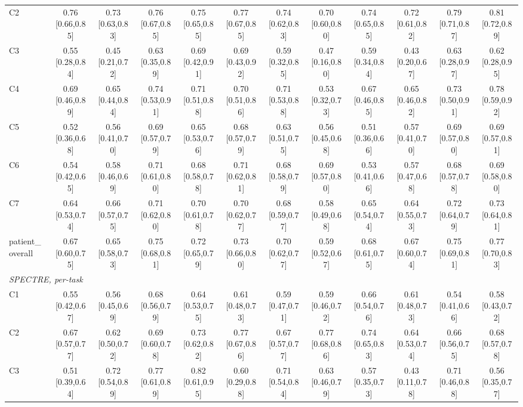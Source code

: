 \begin{tabular}{lccccccccccc}
C2 & 0.76 [0.66,0.85] & 0.73 [0.63,0.83] & 0.76 [0.67,0.85] & 0.75 [0.65,0.85] & 0.77 [0.67,0.85] & 0.74 [0.62,0.83] & 0.70 [0.60,0.80] & 0.74 [0.65,0.85] & 0.72 [0.61,0.82] & 0.79 [0.71,0.87] & 0.81 [0.72,0.89] \\
C3 & 0.55 [0.28,0.84] & 0.45 [0.21,0.72] & 0.63 [0.35,0.89] & 0.69 [0.42,0.91] & 0.69 [0.43,0.92] & 0.59 [0.32,0.85] & 0.47 [0.16,0.80] & 0.59 [0.34,0.84] & 0.43 [0.20,0.67] & 0.63 [0.28,0.97] & 0.62 [0.28,0.95] \\
C4 & 0.69 [0.46,0.89] & 0.65 [0.44,0.84] & 0.74 [0.53,0.91] & 0.71 [0.51,0.88] & 0.70 [0.51,0.86] & 0.71 [0.53,0.88] & 0.53 [0.32,0.73] & 0.67 [0.46,0.85] & 0.65 [0.46,0.82] & 0.73 [0.50,0.91] & 0.78 [0.59,0.92] \\
C5 & 0.52 [0.36,0.68] & 0.56 [0.41,0.70] & 0.69 [0.57,0.79] & 0.65 [0.53,0.76] & 0.68 [0.57,0.79] & 0.63 [0.51,0.75] & 0.56 [0.45,0.68] & 0.51 [0.36,0.66] & 0.57 [0.41,0.70] & 0.69 [0.57,0.80] & 0.69 [0.57,0.81] \\
C6 & 0.54 [0.42,0.65] & 0.58 [0.46,0.69] & 0.71 [0.61,0.80] & 0.68 [0.58,0.78] & 0.71 [0.62,0.81] & 0.68 [0.58,0.79] & 0.69 [0.57,0.80] & 0.53 [0.41,0.66] & 0.57 [0.47,0.68] & 0.68 [0.57,0.78] & 0.69 [0.58,0.80] \\
C7 & 0.64 [0.53,0.74] & 0.66 [0.57,0.75] & 0.71 [0.62,0.80] & 0.70 [0.61,0.78] & 0.70 [0.62,0.77] & 0.68 [0.59,0.77] & 0.58 [0.49,0.68] & 0.65 [0.54,0.74] & 0.64 [0.55,0.73] & 0.72 [0.64,0.79] & 0.73 [0.64,0.81] \\
patient\_overall & 0.67 [0.60,0.75] & 0.65 [0.58,0.73] & 0.75 [0.68,0.81] & 0.72 [0.65,0.79] & 0.73 [0.66,0.80] & 0.70 [0.62,0.77] & 0.59 [0.52,0.67] & 0.68 [0.61,0.75] & 0.67 [0.60,0.74] & 0.75 [0.69,0.81] & 0.77 [0.70,0.83] \\
\multicolumn{12}{l}{\textit{SPECTRE, per-task}} \\
C1 & 0.55 [0.42,0.67] & 0.56 [0.45,0.69] & 0.68 [0.56,0.79] & 0.64 [0.53,0.75] & 0.61 [0.48,0.73] & 0.59 [0.47,0.71] & 0.59 [0.46,0.72] & 0.66 [0.54,0.76] & 0.61 [0.48,0.73] & 0.54 [0.41,0.66] & 0.58 [0.43,0.72] \\
C2 & 0.67 [0.57,0.77] & 0.62 [0.50,0.72] & 0.69 [0.60,0.78] & 0.73 [0.62,0.82] & 0.77 [0.67,0.86] & 0.67 [0.57,0.77] & 0.77 [0.68,0.86] & 0.74 [0.65,0.83] & 0.64 [0.53,0.74] & 0.66 [0.56,0.75] & 0.68 [0.57,0.78] \\
C3 & 0.51 [0.39,0.64] & 0.72 [0.54,0.89] & 0.77 [0.61,0.89] & 0.82 [0.61,0.95] & 0.60 [0.29,0.88] & 0.71 [0.54,0.84] & 0.63 [0.46,0.79] & 0.57 [0.35,0.73] & 0.43 [0.11,0.78] & 0.71 [0.46,0.88] & 0.56 [0.35,0.77] \\

\end{tabular}
